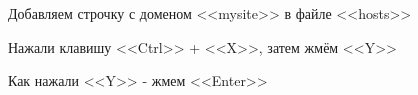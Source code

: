\begin{figure}[p]
    \caption{Добавляем строчку с доменом <<mysite>> в файле <<hosts>>}
    \label{fig:sudo-nano-hosts-step-2}
\end{figure}

\begin{figure}[p]
    \caption{Нажали клавишу <<Ctrl>> + <<X>>, затем жмём <<Y>>}
    \label{fig:sudo-nano-hosts-step-3}
\end{figure}

\begin{figure}[p]
    \caption{Как нажали <<Y>> - жмем <<Enter>>}
    \label{fig:sudo-nano-hosts-step-4}
\end{figure}

